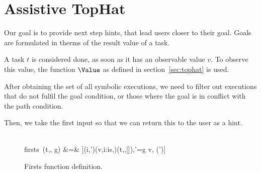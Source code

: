 
\section{Assistive TopHat}
\label{sec:assistive}

Our goal is to provide next step hints, that lead users closer to their goal.
Goals are formulated in therms of the result value of a task.

A task $t$ is considered done, as soon as it has an observable value $v$.
To observe this value, the function $\Value$ as defined in section~\ref{sec:tophat} is used.

After obtaining the set of all symbolic executions, we need to filter out executions that do not fulfil the goal condition, or those where the goal is in conflict with the path condition.

Then, we take the first input so that we can return this to the user as a hint.

\begin{figure*}[t]
  \begin{function}
    \signature{firsts :  \times {} \times {}
      \rightarrow {}} \\
    firsts\ (t,\sigma, g) &=& [(i,\phi')\mid (v,i:is,\phi)\leftarrow \Simulate(t,\sigma,[]\True),\phi'=\phi\land g v, \Sat(\phi')]
  \end{function}
  \caption{Firsts function definition.}
  \label{fig:firsts}
\end{figure*}
